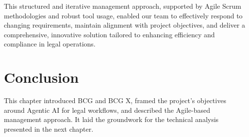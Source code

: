This structured and iterative management approach, supported by Agile Scrum methodologies and robust tool usage, enabled our team to effectively respond to changing requirements, maintain alignment with project objectives, and deliver a comprehensive, innovative solution tailored to enhancing efficiency and compliance in legal operations.


\section{Conclusion}
This chapter introduced BCG and BCG X, framed the project’s objectives around Agentic AI for legal workflows, and described the Agile-based management approach. It laid the groundwork for the technical analysis presented in the next chapter.